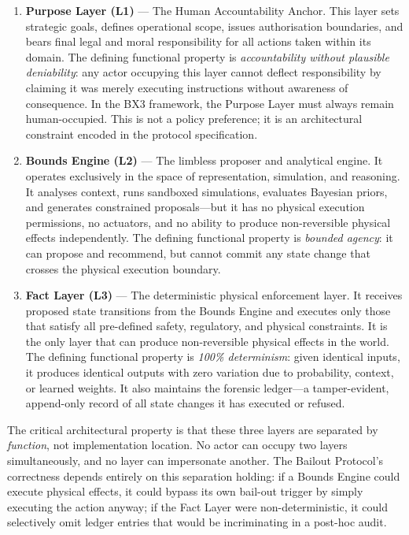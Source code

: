 \begin{enumerate}
\item \textbf{Purpose Layer (L1)} --- The Human Accountability Anchor. This layer sets strategic goals, defines operational scope, issues authorisation boundaries, and bears final legal and moral responsibility for all actions taken within its domain. The defining functional property is \textit{accountability without plausible deniability}: any actor occupying this layer cannot deflect responsibility by claiming it was merely executing instructions without awareness of consequence. In the BX3 framework, the Purpose Layer must always remain human-occupied. This is not a policy preference; it is an architectural constraint encoded in the protocol specification.

\item \textbf{Bounds Engine (L2)} --- The limbless proposer and analytical engine. It operates exclusively in the space of representation, simulation, and reasoning. It analyses context, runs sandboxed simulations, evaluates Bayesian priors, and generates constrained proposals---but it has no physical execution permissions, no actuators, and no ability to produce non-reversible physical effects independently. The defining functional property is \textit{bounded agency}: it can propose and recommend, but cannot commit any state change that crosses the physical execution boundary.

\item \textbf{Fact Layer (L3)} --- The deterministic physical enforcement layer. It receives proposed state transitions from the Bounds Engine and executes only those that satisfy all pre-defined safety, regulatory, and physical constraints. It is the only layer that can produce non-reversible physical effects in the world. The defining functional property is \textit{100\% determinism}: given identical inputs, it produces identical outputs with zero variation due to probability, context, or learned weights. It also maintains the forensic ledger---a tamper-evident, append-only record of all state changes it has executed or refused.
\end{enumerate}

The critical architectural property is that these three layers are separated by \textit{function}, not implementation location. No actor can occupy two layers simultaneously, and no layer can impersonate another. The Bailout Protocol's correctness depends entirely on this separation holding: if a Bounds Engine could execute physical effects, it could bypass its own bail-out trigger by simply executing the action anyway; if the Fact Layer were non-deterministic, it could selectively omit ledger entries that would be incriminating in a post-hoc audit.

